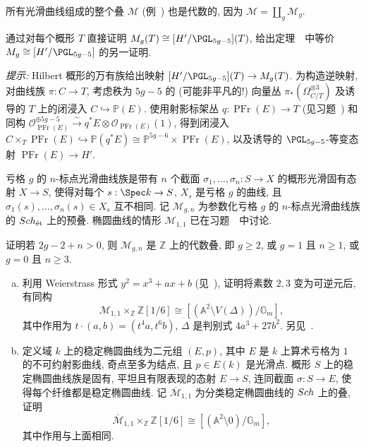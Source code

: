\begin{remark}\label{src:4.1.18}
所有光滑曲线组成的整个叠 $\mathcal M$ (例~) 也是代数的, 因为 $\mathcal M=\coprod_g\mathcal M_g$.
\end{remark}
\begin{exercise}[有益的练习]\label{src:4.1.19}
通过对每个概形 $T$ 直接证明 $\mathcal M_g(T)\cong[H'/\PGL_{5g-5}](T)$, 给出定理~~中等价 $\mathcal M_g\cong[H'/\PGL_{5g-5}]$ 的另一证明.

\textit{提示:} Hilbert 概形的万有族给出映射 $[H'/\PGL_{5g-5}](T)\to\mathcal M_g(T)$.
为构造逆映射, 对曲线族 $\pi:C\to T$, 考虑秩为 $5g-5$ 的 (可能非平凡的!) 向量丛 $\pi_*(\Omega_{C/T}^{\otimes3})$ 及诱导的 $T$ 上的闭浸入 $C\hookrightarrow\mathbb P(E)$.
使用射影标架丛 $q:\operatorname{PFr}(E)\to T$ (见习题~) 和同构
$\mathcal O_{\operatorname{PFr}(E)}^{\oplus5g-5}\xrightarrow{\sim}q^*E\otimes\mathcal O_{\operatorname{PFr}(E)}(1)$,
得到闭浸入 $C\times_T\operatorname{PFr}(E)\hookrightarrow\mathbb P(q^*E)\cong\mathbb P^{5g-6}\times\operatorname{PFr}(E)$, 以及诱导的 $\PGL_{5g-5}$-等变态射 $\operatorname{PFr}(E)\to H'$.
\end{exercise}
亏格 $g$ 的 $n$-标点光滑曲线族是带有 $n$ 个截面 $\sigma_1,\ldots,\sigma_n:S\to X$ 的概形光滑固有态射 $X\to S$, 使得对每个 $s:\Spec k\to S$, $X_s$ 是亏格 $g$ 的曲线, 且 $\sigma_1(s),\ldots,\sigma_n(s)\in X_s$ 互不相同.
记 $\mathcal M_{g,n}$ 为参数化亏格 $g$ 的 $n$-标点光滑曲线族的 $Sch_{\text{ét}}$ 上的预叠. 椭圆曲线的情形 $\mathcal M_{1,1}$ 已在习题~~中讨论.
\begin{exercise}\label{src:4.1.20}
证明若 $2g-2+n>0$, 则 $\mathcal M_{g,n}$ 是 $\mathbb Z$ 上的代数叠, 即 $g\geq2$, 或 $g=1$ 且 $n\geq1$, 或 $g=0$ 且 $n\geq3$.
\end{exercise}
\begin{exercise}[椭圆曲线的模]\label{src:4.1.21}
\begin{enumerate}[(a)]
\item 利用 Weierstrass 形式 $y^2=x^3+ax+b$ (见~\cite[§3.1]{Sil09}), 证明将素数 $2,3$ 变为可逆元后, 有同构
\[
\mathcal M_{1,1}\times_{\mathbb Z}\mathbb Z[1/6]\cong[(\mathbb A^2\setminus V(\Delta))/\mathbb G_m],
\]
其中作用为 $t\cdot(a,b)=(t^4a,t^6b)$, $\Delta$ 是判别式 $4a^3+27b^2$. 另见~\cite[§3, 定理 $1$]{MS72}.
\item 定义域 $k$ 上的稳定椭圆曲线为二元组 $(E,p)$, 其中 $E$ 是 $k$ 上算术亏格为 $1$ 的不可约射影曲线, 奇点至多为结点, 且 $p\in E(k)$ 是光滑点.
概形 $S$ 上的稳定椭圆曲线族是固有, 平坦且有限表现的态射 $E\to S$, 连同截面 $\sigma:S\to E$, 使得每个纤维都是稳定椭圆曲线.
记 $\overline{\mathcal M}_{1,1}$ 为分类稳定椭圆曲线的 $Sch$ 上的叠, 证明
\[
\overline{\mathcal M}_{1,1}\times_{\mathbb Z}\mathbb Z[1/6]\cong[(\mathbb A^2\setminus0)/\mathbb G_m],
\]
其中作用与上面相同.
\end{enumerate}
\end{exercise}

